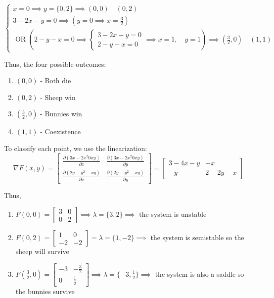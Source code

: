 \documentclass[12pt]{article}
\begin{document}
\[\begin{cases}
    x = 0 \implies y = \{0, 2\} \implies \boxed{(0, 0) \quad (0, 2)}\\
    3 - 2x - y = 0 \implies (y = 0 \implies x = \frac{3}{2}) \\
    \text{ OR } \left(2-y-x = 0 \implies \begin{cases}
        3 - 2x - y = 0\\
        2 - y - x = 0
    \end{cases} \implies x = 1, \quad y = 1\right) \implies \boxed{(\frac{3}{2}, 0) \quad (1, 1)}
\end{cases}\]

Thus, the four possible outcomes:
\begin{enumerate}
    \item $(0, 0)$ - Both die 
    \item $(0, 2)$ - Sheep win
    \item $(\frac{3}{2}, 0)$ - Bunnies win 
    \item $(1, 1)$ - Coexistence
\end{enumerate}

To classify each point, we use the linearization:
\[\nabla F(x, y) = \begin{bmatrix}
    \frac{\partial (3x - 2x^2 0 xy)}{\partial x} & \frac{\partial (3x - 2x^2 0 xy)}{\partial y}\\
    \frac{\partial (2y - y^2 - xy)}{\partial x} & \frac{\partial (2y- y^2 - xy)}{\partial y}
\end{bmatrix} = \begin{bmatrix}
    3 - 4x - y & -x\\
    -y & 2 - 2y - x
\end{bmatrix}\]

Thus,
\begin{enumerate}
    \item $F(0, 0) = \begin{bmatrix}
        3 & 0 \\
        0 & 2
    \end{bmatrix} \implies \lambda = \{3, 2\} \implies$ the system is unstable 
    \item $F(0, 2) = \begin{bmatrix}
        1 & 0\\
        -2 & -2
    \end{bmatrix} = \lambda = \{1, -2\} \implies$ the system is semistable so the sheep will survive
    \item $F(\frac{3}{2}, 0) = \begin{bmatrix}
        -3 & -\frac{3}{2}\\
        0 & \frac{1}{2}
    \end{bmatrix} \implies \lambda = \{-3, \frac{1}{2}\} \implies $ the system is also a saddle so the bunnies survive
\end{enumerate}
\end{document}
